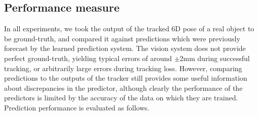 
\subsection{Performance measure}\label{sec:Experiment.Performance}

In all experiments, we took the output of the tracked 6D pose of a
real object to be ground-truth, and compared it against predictions
which were previously forecast by the learned prediction system. The
vision system does not provide perfect ground-truth, yielding typical
errors of around $\pm$2mm during successful tracking, or arbitrarily
large errors during tracking loss. However, comparing
predictions to the outputs of the tracker still provides some useful
information about discrepancies in the predictor, although clearly the
performance of the predictors is limited by the accuracy of the data
on which they are trained. Prediction performance is evaluated as
follows.
